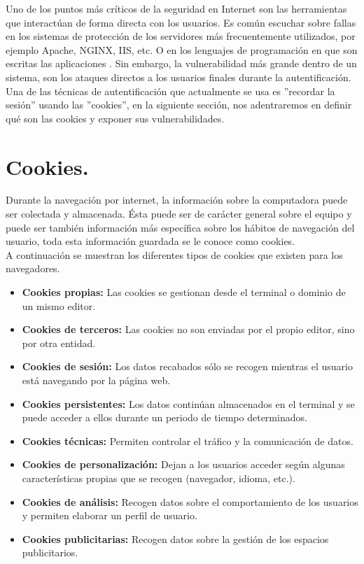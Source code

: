 \documentclass[12pt, a4paper, titlepage]{report}
\begin{document}
		Uno de los puntos más críticos de la seguridad en Internet son las herramientas que interactúan de forma directa con los usuarios. Es común escuchar sobre fallas en los sistemas de protección de los servidores más frecuentemente utilizados, por ejemplo Apache, NGINX, IIS, etc. O en los lenguajes de programación en que son escritas las aplicaciones \cite{refSeguridadWeb}. Sin embargo, la vulnerabilidad más grande dentro de un sistema, son los ataques directos a los usuarios finales durante la autentificación.\\
	    
	    Una de las técnicas de autentificación que actualmente se usa es ''recordar la sesión'' usando las ''cookies'', en la siguiente sección, nos adentraremos en definir qué son las cookies y exponer sus vulnerabilidades.
	    
	    \section{Cookies. }
		Durante la navegación por internet, la información sobre la computadora puede ser colectada y almacenada. Ésta puede ser de carácter general sobre el equipo y puede ser también información más específica sobre los hábitos de navegación del usuario, toda esta información guardada se le conoce como \Gls{cookies}. \\
		A continuación se muestran los diferentes tipos de cookies que existen para los navegadores.
		
		\begin{itemize}
		    \item \textbf{Cookies propias:} Las cookies se gestionan desde el terminal o dominio de un mismo editor.
		    \item \textbf{Cookies de terceros:} Las cookies no son enviadas por el propio editor, sino por otra entidad.  
		    \item \textbf{Cookies de sesión:} Los datos recabados sólo se recogen mientras el usuario está navegando por la página web.
		    \item \textbf{Cookies persistentes:} Los datos continúan almacenados en el terminal y se puede acceder a ellos durante un periodo de tiempo determinados.
		    \item \textbf{Cookies técnicas:} Permiten controlar el tráfico y la comunicación de datos.		
            \item \textbf{Cookies de personalización:} Dejan a los usuarios acceder según algunas características propias que se recogen (navegador, idioma, etc.).
            \item \textbf{Cookies de análisis:} Recogen datos sobre el comportamiento de los usuarios y permiten elaborar un perfil de usuario.
            \item \textbf{Cookies publicitarias:} Recogen datos sobre la gestión de los espacios publicitarios.
        \end{itemize}
		
\end{document}
